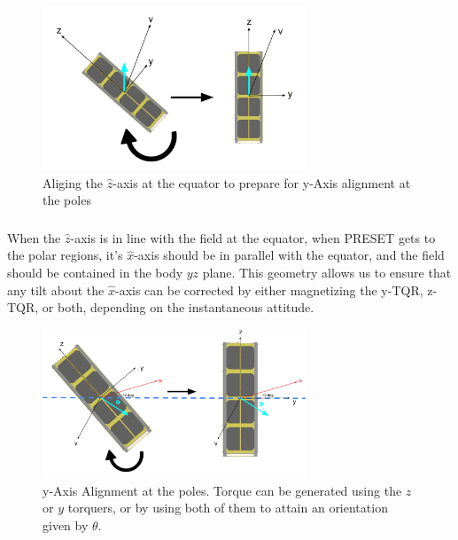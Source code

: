 \documentclass{article}
\begin{document}
\begin{figure}[H]
    \centering
    \includegraphics[width=0.7\textwidth]{Initial Alignment.png}
    \caption{Aliging the $\hat{z}$-axis at the equator to prepare for y-Axis alignment at the poles}
    \label{fig:enter-label}
\end{figure}

\subsubsection{\color{black}{y-Axis Alignment}}

When the $\hat{z}$-axis is in line with the field at the equator, when PRESET gets to the polar regions, it's $\hat{x}$-axis should be in parallel with the equator, and the field should be contained in the body $yz$ plane. This geometry allows us to ensure that any tilt about the $\hat{x}$-axis can be corrected by either magnetizing the y-TQR, z-TQR, or both, depending on the instantaneous attitude.

\begin{figure}[H]
    \centering
    \includegraphics[width=0.7\textwidth]{y-Axis Alignment.png}
    \caption{y-Axis Alignment at the poles. Torque can be generated using the $z$ or $y$ torquers, or by using both of them to attain an orientation given by $\theta$.}
    \label{fig:enter-label}
\end{figure}

\subsubsection{\color{black}{Spin-Up}}
\end{document}
